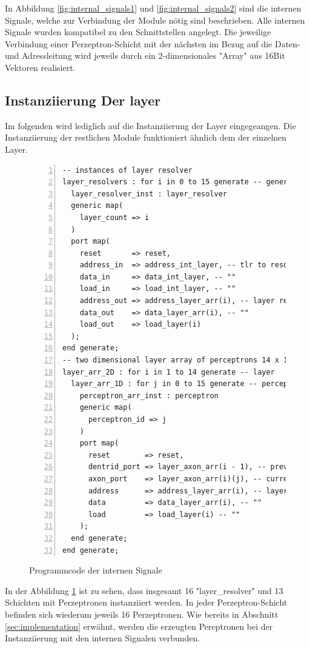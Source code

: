 \documentclass{article}
\numberwithin{equation}{section}
\begin{document}
\FloatBarrier
In Abbildung \ref{fig:internal_signals1} und \ref{fig:internal_signals2} sind die
internen Signale, welche zur Verbindung der Module nötig sind beschrieben.
Alle internen Signale wurden kompatibel zu den Schnittstellen angelegt.
Die jeweilige Verbindung einer Perzeptron-Schicht mit der nächsten im Bezug auf 
die Daten- und Adressleitung wird jeweils durch ein 2-dimensionales "Array" aus 
16Bit Vektoren realisiert.
\pagebreak
\subsection{Instanziierung Der layer}
Im folgenden wird lediglich auf die Instanziierung der Layer eingegeangen. 
Die Instanziierung der restlichen Module funktioniert ähnlich dem der einzelnen Layer.
\begin{figure}[htbp]
\begin{lstlisting}[style=VHDL,numbers=left,stepnumber=1,style=myCustomMatlabStyle,basicstyle=\footnotesize]
-- instances of layer resolver
layer_resolvers : for i in 0 to 15 generate -- generate 16 layer resolvers
  layer_resolver_inst : layer_resolver
  generic map(
    layer_count => i
  )
  port map(
    reset       => reset,
    address_in  => address_int_layer, -- tlr to resolvers
    data_in     => data_int_layer, -- ""
    load_in     => load_int_layer, -- ""
    address_out => address_layer_arr(i), -- layer resolver to perceptron array
    data_out    => data_layer_arr(i), -- ""
    load_out    => load_layer(i)
  );
end generate;
-- two dimensional layer array of perceptrons 14 x 16 (layer x perceptron)
layer_arr_2D : for i in 1 to 14 generate -- layer
  layer_arr_1D : for j in 0 to 15 generate -- perceptron in layer
    perceptron_arr_inst : perceptron
    generic map(
      perceptron_id => j
    )
    port map(
      reset        => reset,
      dentrid_port => layer_axon_arr(i - 1), -- prev layer to current layer
      axon_port    => layer_axon_arr(i)(j), -- current to next layer
      address      => address_layer_arr(i), -- layer resolver to perceptron array
      data         => data_layer_arr(i), -- ""
      load         => load_layer(i) -- ""
    );
  end generate;
end generate;
\end{lstlisting}
\caption{Programmcode der internen Signale} \label{code:generate_layers}
\end{figure}
\FloatBarrier
In der Abbildung \ref{code:generate_layers} ist zu sehen, dass insgesamt 16 
"layer\_resolver" und 13 Schichten mit Perzeptronen instanziiert werden. In jeder 
Perzeptron-Schicht befinden sich wiederum jeweils 16 Perzeptronen. Wie bereits in 
Abschnitt \ref{sec:implementation} erwähnt, werden die erzeugten Pereptronen
bei der Instanziierung mit den internen Signalen verbunden.
\pagebreak
\end{document}
